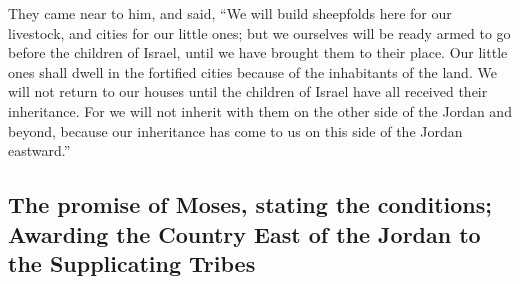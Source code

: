  They came near to him, and said, ``We will build
sheepfolds here for our livestock, and cities for our little ones;
 but we ourselves will be ready armed to go before the
children of Israel, until we have brought them to their place. Our
little ones shall dwell in the fortified cities because of the
inhabitants of the land.  We will not return to our
houses until the children of Israel have all received their inheritance.
 For we will not inherit with them on the other side of
the Jordan and beyond, because our inheritance has come to us on this
side of the Jordan eastward.''

\hypertarget{the-promise-of-moses-stating-the-conditions-awarding-the-country-east-of-the-jordan-to-the-supplicating-tribes}{%
\subsection{The promise of Moses, stating the conditions; Awarding the
Country East of the Jordan to the Supplicating
Tribes}\label{the-promise-of-moses-stating-the-conditions-awarding-the-country-east-of-the-jordan-to-the-supplicating-tribes}}

